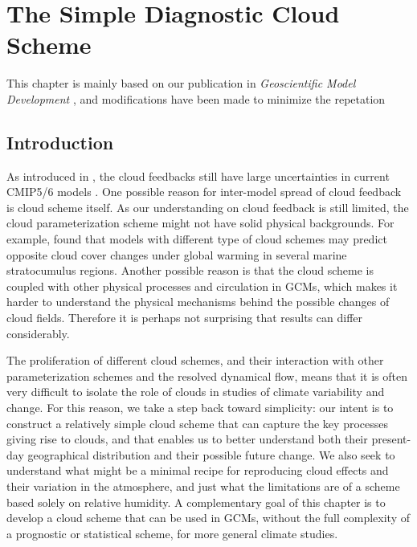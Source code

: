 \chapter{The Simple Diagnostic Cloud Scheme}
\label{ch:simple_cld_scheme}

This chapter is mainly based on our publication in \textit{Geoscientific Model Development} \citep{Liu2021simcloud}, and modifications have been made to minimize the repetation

\section{Introduction}

As introduced in , the cloud feedbacks still have large uncertainties in current CMIP5/6 models \citep{Zelinka2020causes}. One possible reason for inter-model spread of cloud feedback is cloud scheme itself. As our understanding on cloud feedback is still limited, the cloud parameterization scheme might not have solid physical backgrounds. For example, \cite{Qu2014} found that models with different type of cloud schemes may predict opposite cloud cover changes under global warming in several marine stratocumulus regions. Another possible reason is that the cloud scheme is coupled with other physical processes and circulation in GCMs, which makes it harder to understand the physical mechanisms behind the possible changes of cloud fields. Therefore it is perhaps not surprising that results can differ considerably.  

The proliferation of different cloud schemes, and their interaction with other parameterization schemes and the resolved dynamical flow, means that it is often very difficult to isolate the role of clouds in studies of climate variability and change. For this reason,  we take a step back toward simplicity: our intent is to construct a relatively simple cloud scheme that can capture the key processes giving rise to clouds, and that enables us to better understand both their present-day geographical distribution and their possible future change. We also seek to understand what might be a minimal recipe for reproducing cloud effects and their variation in the atmosphere, and just what the limitations are of a scheme based solely on relative humidity. A complementary goal of this chapter is to develop a cloud scheme that can be used in GCMs, without the full complexity of a prognostic or statistical scheme, for more general climate studies.

